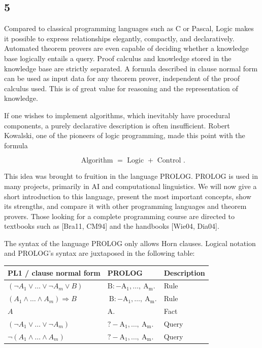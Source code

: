 \documentclass[10pt]{book}
\begin{document}
\begin{center}
\section*{5}
Compared to classical programming languages such as C or Pascal, Logic makes it possible to express relationships elegantly, compactly, and declaratively. Automated theorem provers are even capable of deciding whether a knowledge base logically entails a query. Proof calculus and knowledge stored in the knowledge base are strictly separated. A formula described in clause normal form can be used as input data for any theorem prover, independent of the proof calculus used. This is of great value for reasoning and the representation of knowledge.

If one wishes to implement algorithms, which inevitably have procedural components, a purely declarative description is often insufficient. Robert Kowalski, one of the pioneers of logic programming, made this point with the formula

$$
\text { Algorithm }=\text { Logic }+ \text { Control } .
$$

This idea was brought to fruition in the language PROLOG. PROLOG is used in many projects, primarily in AI and computational linguistics. We will now give a short introduction to this language, present the most important concepts, show its strengths, and compare it with other programming languages and theorem provers. Those looking for a complete programming course are directed to textbooks such as [Bra11, CM94] and the handbooks [Wie04, Dia04].

The syntax of the language PROLOG only allows Horn clauses. Logical notation and PROLOG's syntax are juxtaposed in the following table:

\begin{center}
\begin{tabular}{lll}
\hline
PL1 / clause normal form & PROLOG & Description \\
\hline
$\left(\neg A_{1} \vee \ldots \vee \neg A_{m} \vee B\right)$ & $\mathrm{B}:-\mathrm{A}_{1}, \ldots, \mathrm{~A}_{\mathrm{m}}$. & Rule \\
\hline
$\left(A_{1} \wedge \ldots \wedge A_{m}\right) \Rightarrow B$ & $\mathrm{~B}:-\mathrm{A}_{1}, \ldots, \mathrm{~A}_{\mathrm{m}}$. & Rule \\
\hline
$A$ & A. & Fact \\
\hline
$\left(\neg A_{1} \vee \ldots \vee \neg A_{m}\right)$ & $?-\mathrm{A}_{1}, \ldots, \mathrm{~A}_{\mathrm{m}}$. & Query \\
\hline
$\neg\left(A_{1} \wedge \ldots \wedge A_{m}\right)$ & $?-\mathrm{A}_{1}, \ldots, \mathrm{~A}_{\mathrm{m}}$. & Query \\
\hline
\end{tabular}
\end{center}


\end{center}
\end{document}
